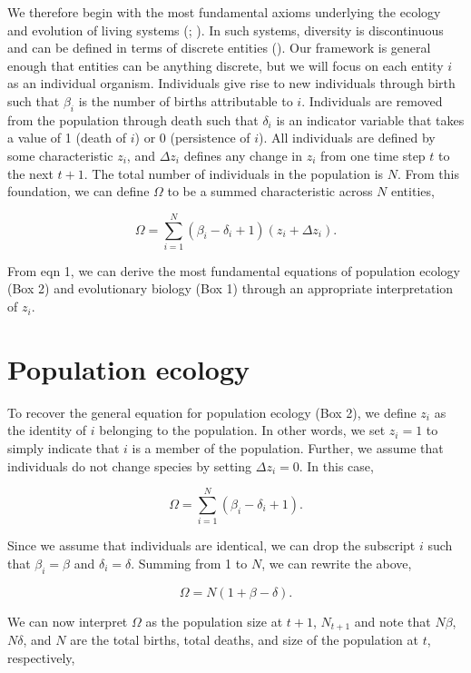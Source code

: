 \documentclass[
]{article}
\begin{document}
We therefore begin with the most fundamental axioms underlying the
ecology and evolution of living systems (; ). In such
systems, diversity is discontinuous and can be defined in terms of
discrete entities (). Our
framework is general enough that entities can be anything discrete, but
we will focus on each entity \(i\) as an individual organism.
Individuals give rise to new individuals through birth such that
\(\beta_{i}\) is the number of births attributable to \(i\). Individuals
are removed from the population through death such that \(\delta_{i}\)
is an indicator variable that takes a value of 1 (death of \(i\)) or 0
(persistence of \(i\)). All individuals are defined by some
characteristic \(z_{i}\), and \(\Delta z_{i}\) defines any change in
\(z_{i}\) from one time step \(t\) to the next \(t + 1\). The total
number of individuals in the population is \(N\). From this foundation,
we can define \(\Omega\) to be a summed characteristic across \(N\)
entities,

\[\Omega = \sum_{i=1}^{N} \left(\beta_{i} - \delta_{i} + 1 \right)\left(z_{i} + \Delta z_{i} \right).
\tag{1}
\]

From eqn 1, we can derive the most fundamental equations of population
ecology (Box 2) and evolutionary biology (Box 1) through an appropriate
interpretation of \(z_{i}\).

\section{Population ecology}\label{population-ecology}

To recover the general equation for population ecology (Box 2), we
define \(z_{i}\) as the identity of \(i\) belonging to the population.
In other words, we set \(z_{i} = 1\) to simply indicate that \(i\) is a
member of the population. Further, we assume that individuals do not
change species by setting \(\Delta z_{i} = 0\). In this case,

\[\Omega = \sum_{i=1}^{N} \left(\beta_{i} - \delta_{i} + 1 \right).\]

Since we assume that individuals are identical, we can drop the
subscript \(i\) such that \(\beta_{i} = \beta\) and
\(\delta_{i} = \delta\). Summing from 1 to \(N\), we can rewrite the
above,

\[\Omega = N\left(1 + \beta - \delta \right).\]

We can now interpret \(\Omega\) as the population size at \(t+1\),
\(N_{t+1}\) and note that \(N\beta\), \(N\delta\), and \(N\) are the
total births, total deaths, and size of the population at \(t\),
respectively,
\end{document}
